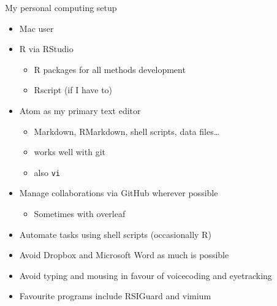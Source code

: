 \documentclass[ignorenonframetext,]{beamer}
\providecommand{\tightlist}{%
  \setlength{\itemsep}{0pt}\setlength{\parskip}{0pt}}
\begin{document}
\begin{frame}[fragile]{My personal computing setup}
\protect\hypertarget{my-personal-computing-setup}{}

\begin{itemize}
\tightlist
\item
  Mac user
\item
  R via RStudio

  \begin{itemize}
  \tightlist
  \item
    R packages for all methods development
  \item
    Rscript (if I have to)
  \end{itemize}
\item
  Atom as my primary text editor

  \begin{itemize}
  \tightlist
  \item
    Markdown, RMarkdown, shell scripts, data files\ldots{}
  \item
    works well with git
  \item
    also \texttt{vi}
  \end{itemize}
\item
  Manage collaborations via GitHub wherever possible

  \begin{itemize}
  \tightlist
  \item
    Sometimes with overleaf
  \end{itemize}
\item
  Automate tasks using shell scripts (occasionally R)
\item
  Avoid Dropbox and Microsoft Word as much is possible
\item
  Avoid typing and mousing in favour of voicecoding and eyetracking
\item
  Favourite programs include RSIGuard and vimium
\end{itemize}

\end{frame}
\end{document}
